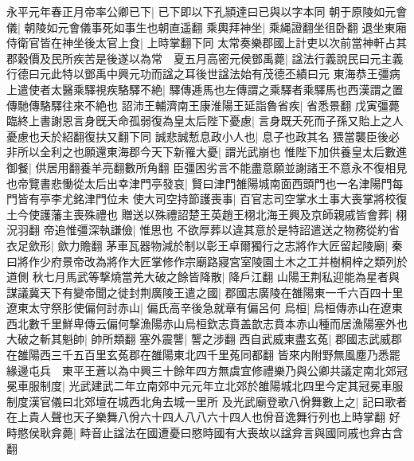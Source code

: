 永平元年春正月帝率公卿已下|{
	已下即以下孔頴達曰已與以字本同}
朝于原陵如元會儀|{
	朝陵如元會儀事死如事生也朝直遥翻}
乘輿拜神坐|{
	乘䋲證翻坐徂卧翻}
退坐東廂侍衛官皆在神坐後太官上食|{
	上時掌翻下同}
太常奏樂郡國上計吏以次前當神軒占其郡穀價及民所疾苦是後遂以為常　夏五月高密元侯鄧禹薨|{
	諡法行義說民曰元主義行德曰元此特以鄧禹中興元功而諡之耳後世諡法始有茂德丕績曰元}
東海恭王彊病上遣使者太醫乘驛視疾駱驛不絶|{
	驛傳逓馬也左傳謂之乘驛者乘驛馬也西漢謂之置傳馳傳駱驛往來不絶也}
詔沛王輔濟南王康淮陽王延詣魯省疾|{
	省悉景翻}
戊寅彊薨臨終上書謝恩言身旣夭命孤弱復為皇太后陛下憂慮|{
	言身既夭死而子孫又貽上之人憂慮也夭於紹翻復扶又翻下同}
誠悲誠慙息政小人也|{
	息子也政其名}
猥當襲臣後必非所以全利之也願還東海郡今天下新罹大憂|{
	謂光武崩也}
惟陛下加供養皇太后數進御餐|{
	供居用翻養羊亮翻數所角翻}
臣彊困劣言不能盡意願並謝諸王不意永不復相見也帝覽書悲慟從太后出幸津門亭發哀|{
	賢曰津門雒陽城南面西頭門也一名津陽門每門皆有亭李尤銘津門位未}
使大司空持節護喪事|{
	百官志司空掌水土事大喪掌將校復土今使護藩主喪殊禮也}
贈送以殊禮詔楚王英趙王栩北海王興及京師親戚皆會葬|{
	栩況羽翻}
帝追惟彊深執謙儉|{
	惟思也}
不欲厚葬以違其意於是特詔遣送之物務從約省衣足歛形|{
	歛力贍翻}
茅車瓦器物減於制以彰王卓爾獨行之志將作大匠留起陵廟|{
	秦曰將作少府景帝改為將作大匠掌修作宗廟路寢宮室陵園土木之工并樹桐梓之類列於道側}
秋七月馬武等撃燒當羌大破之餘皆降散|{
	降戶江翻}
山陽王荆私迎能為星者與謀議冀天下有變帝聞之徙封荆廣陵王遣之國|{
	郡國志廣陵在雒陽東一千六百四十里}
遼東太守祭肜使偏何討赤山|{
	偏氏高辛後急就章有偏呂何}
烏桓|{
	烏桓傳赤山在遼東西北數千里鮮卑傳云偏何撃漁陽赤山烏桓欽志賁盖歆志賁本赤山種而居漁陽塞外也}
大破之斬其魁帥|{
	帥所類翻}
塞外震讋|{
	讋之涉翻}
西自武威東盡玄菟|{
	郡國志武威郡在雒陽西三千五百里玄菟郡在雒陽東北四千里菟同都翻}
皆來内附野無風塵乃悉罷緣邊屯兵　東平王蒼以為中興三十餘年四方無虞宜修禮樂乃與公卿共議定南北郊冠冕車服制度|{
	光武建武二年立南郊中元元年立北郊於雒陽城北四里今定其冠冕車服制度漢官儀曰北郊壇在城西北角去城一里所}
及光武廟登歌八佾舞數上之|{
	記曰歌者在上貴人聲也天子樂舞八佾六十四人八八六十四人也佾音逸舞行列也上時掌翻}
好畤愍侯耿弇薨|{
	畤音止諡法在國遭憂曰愍時國有大喪故以諡弇言與國同戚也弇古含翻}


